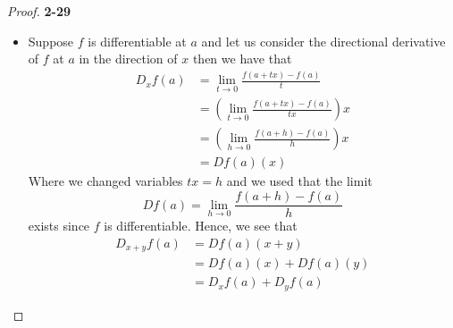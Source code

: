 \documentclass[11pt]{article}
\theoremstyle{definition}
\begin{document}
\begin{proof}{\textbf{2-29}}
\begin{itemize}
\item [(c)] Suppose $f$ is differentiable at $a$ and let us consider the
directional derivative of $f$ at $a$ in the direction of $x$ then
we have that
\begin{align*}
    D_{x}f(a) &= \lim_{t\to 0}\frac{f(a + tx) - f(a)}{t}\\
    &= \left(\lim_{t\to 0}\frac{f(a + tx) - f(a)}{tx}\right)x\\
    &= \left(\lim_{h\to 0}\frac{f(a + h) - f(a)}{h}\right)x\\
    &= Df(a)(x)
\end{align*}
Where we changed variables $tx = h$ and we used that the limit
$$Df(a) = \lim_{h\to 0} \frac{f(a + h) - f(a)}{h}$$
exists since $f$ is differentiable.
Hence, we see that
\begin{align*}
    D_{x + y}f(a) &= Df(a)(x + y)\\
    &= Df(a)(x) + Df(a)(y)\\
    &= D_xf(a) + D_yf(a)
\end{align*}
\end{itemize}
\end{proof}
\end{document}
